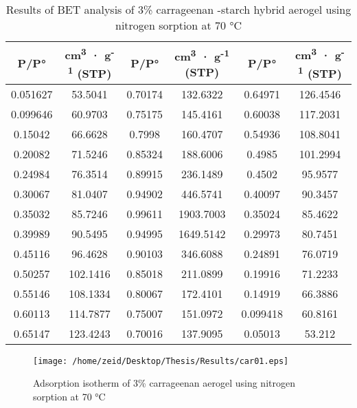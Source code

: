 \documentclass[a4paper,12pt]{article}
\begin{document}
\begin{table}[H]
\centering
\caption{Results of BET analysis of 3\% carrageenan -starch hybrid aerogel using nitrogen sorption at 70 °C}
\label{tab5}
\begin{tabular}{@{}cccccc@{}}
\toprule
\textbf{P/P°} & \textbf{cm\textsuperscript{3} · g\textsuperscript{-1} (STP)} & \textbf{P/P°} & \textbf{cm\textsuperscript{3} · g\textsuperscript{-1} (STP)} & \textbf{P/P°} & \textbf{cm\textsuperscript{3} · g\textsuperscript{-1} (STP)} \\ \midrule
0.051627 & 53.5041 & 0.70174 & 132.6322 & 0.64971 & 126.4546 \\
0.099646 & 60.9703 & 0.75175 & 145.4161 & 0.60038 & 117.2031 \\
0.15042 & 66.6628 & 0.7998 & 160.4707 & 0.54936 & 108.8041 \\
0.20082 & 71.5246 & 0.85324 & 188.6006 & 0.4985 & 101.2994 \\
0.24984 & 76.3514 & 0.89915 & 236.1489 & 0.4502 & 95.9577 \\
0.30067 & 81.0407 & 0.94902 & 446.5741 & 0.40097 & 90.3457 \\
0.35032 & 85.7246 & 0.99611 & 1903.7003 & 0.35024 & 85.4622 \\
0.39989 & 90.5495 & 0.94995 & 1649.5142 & 0.29973 & 80.7451 \\
0.45116 & 96.4628 & 0.90103 & 346.6088 & 0.24891 & 76.0719 \\
0.50257 & 102.1416 & 0.85018 & 211.0899 & 0.19916 & 71.2233 \\
0.55146 & 108.1334 & 0.80067 & 172.4101 & 0.14919 & 66.3886 \\
0.60113 & 114.7877 & 0.75007 & 151.0972 & 0.099418 & 60.8161 \\
0.65147 & 123.4243 & 0.70016 & 137.9095 & 0.05013 & 53.212 \\ \bottomrule
\end{tabular}
\end{table}



















\begin{figure}[H]
  \begin{center}
    \texttt{[image: /home/zeid/Desktop/Thesis/Results/car01.eps]}
    \caption{Adsorption isotherm of 3\% carrageenan aerogel using nitrogen sorption at 70 °C }
    \label{fig1}
  \end{center}
\end{figure}
\end{document}

